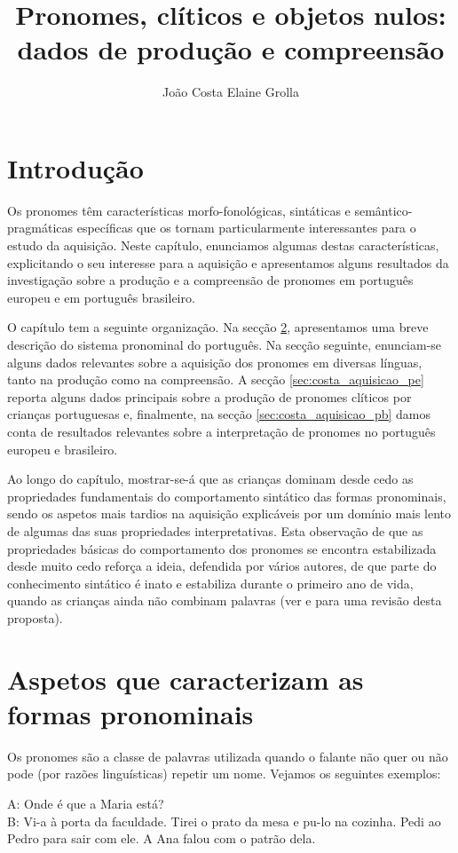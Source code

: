 \documentclass[output=paper]{LSP/langsci}
\author{João Costa\affiliation{Centro de Línguistica da Universidade Nova de Lisboa \& Faculdade de Ciências Sociais e Humanas da Universidade Nova de Lisboa}\lastand 
Elaine Grolla\affiliation{Universidade de São Paulo}
}
\title{Pronomes, clíticos e objetos nulos: dados de produção e compreensão}
\begin{document}
\section{Introdução}
\label{sec:costa_intro}

Os pronomes têm características morfo-fonológicas, sintáticas e semântico-pragmáticas específicas que os tornam particularmente interessantes para o estudo da aquisição. Neste capítulo, enunciamos algumas destas características, explicitando o seu interesse para a aquisição e apresentamos alguns resultados da investigação sobre a produção e a compreensão de pronomes em português europeu e em português brasileiro. 

O capítulo tem a seguinte organização. Na secção \ref{sec:costa_aspetos}, apresentamos uma breve descrição do sistema pronominal do português. Na secção seguinte, enunciam-se alguns dados relevantes sobre a aquisição dos pronomes em diversas línguas, tanto na produção como na compreensão. A secção \ref{sec:costa_aquisicao_pe} reporta alguns dados principais sobre a produção de pronomes clíticos por crianças portuguesas e, finalmente, na secção \ref{sec:costa_aquisicao_pb} damos conta de resultados relevantes sobre a interpretação de pronomes no português europeu e brasileiro.

Ao longo do capítulo, mostrar-se-á que as crianças dominam desde cedo as propriedades fundamentais do comportamento sintático das formas pronominais, sendo os aspetos mais tardios na aquisição explicáveis por um domínio mais lento de algumas das suas propriedades interpretativas. Esta observação de que as propriedades básicas do comportamento dos pronomes se encontra estabilizada desde muito cedo reforça a ideia, defendida por vários autores, de que parte do conhecimento sintático é inato e estabiliza durante o primeiro ano de vida, quando as crianças ainda não combinam palavras (ver \citealt{guasti2002} e \citealt{wexler1998} para uma revisão desta proposta).

\section{Aspetos que caracterizam as formas pronominais}
\label{sec:costa_aspetos}

Os pronomes são a classe de palavras utilizada quando o falante não quer ou não pode (por razões linguísticas) repetir um nome. Vejamos os seguintes exemplos:

\ea\label{ex:costa_1}
A: Onde é que a Maria está?\\B: Vi-a à  porta da faculdade.
\z
\ea\label{ex:costa_2}
Tirei o prato da mesa e pu-lo na cozinha.
\z
\ea\label{ex:costa_3}
Pedi ao Pedro para sair com ele.
\z
\ea\label{ex:costa_4}
A Ana falou com o patrão dela.
\z
\end{document}
